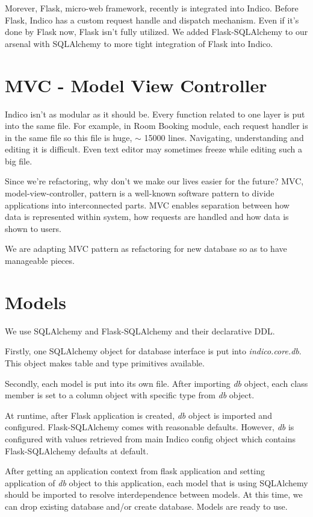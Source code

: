 Morever, Flask, micro-web framework, recently is integrated into Indico. Before Flask, Indico has a custom request handle and dispatch mechanism. Even if it's done by Flask now, Flask isn't fully utilized. We added Flask-SQLAlchemy to our arsenal with SQLAlchemy to more tight integration of Flask into Indico.

\section{MVC - Model View Controller}

Indico isn't as modular as it should be. Every function related to one layer is put into the same file. For example, in Room Booking module, each request handler is in the same file so this file is huge, $\sim$ 15000 lines. Navigating, understanding and editing it is difficult. Even text editor may sometimes freeze while editing such a big file.

Since we're refactoring, why don't we make our lives easier for the future? MVC, model-view-controller, pattern is a well-known software pattern to divide applications into interconnected parts. MVC enables separation between how data is represented within system, how requests are handled and how data is shown to users.

We are adapting MVC pattern as refactoring for new database so as to have manageable pieces.

\section{Models}

We use SQLAlchemy and Flask-SQLAlchemy and their declarative DDL. 

Firstly, one SQLAlchemy object for database interface is put into \textit{indico.core.db}. This object makes table and type primitives available.

Secondly, each model is put into its own file. After importing \textit{db} object, each class member is set to  a column object with specific type from \textit{db} object.

At runtime, after Flask application is created, \textit{db} object is imported and configured. Flask-SQLAlchemy comes with reasonable defaults. However, \textit{db} is configured with values retrieved from main Indico config object which contains Flask-SQLAlchemy defaults at default.

After getting an application context from flask application and setting application of \textit{db} object to this application, each model that is using SQLAlchemy should  be imported to resolve interdependence between models. At this time, we can drop existing database and/or create database. Models are ready to use.

